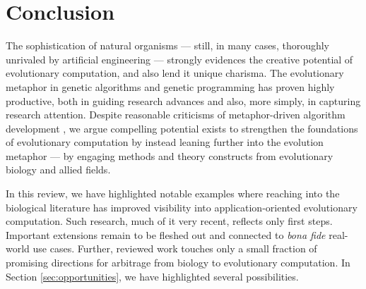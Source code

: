 
\section{Conclusion} \label{sec:conclusion}

The sophistication of natural organisms --- still, in many cases, thoroughly unrivaled by artificial engineering --- strongly evidences the creative potential of evolutionary computation, and also lend it unique charisma.
The evolutionary metaphor in genetic algorithms and genetic programming has proven highly productive, both in guiding research advances and also, more simply, in capturing research attention.
Despite reasonable criticisms of metaphor-driven algorithm development \citep{moore2023evolution,sorensen2015metaheuristics}, we argue compelling potential exists to strengthen the foundations of evolutionary computation by instead leaning further into the evolution metaphor --- by engaging methods and theory constructs from evolutionary biology and allied fields.

In this review, we have highlighted notable examples where reaching into the biological literature has improved visibility into application-oriented evolutionary computation.
Such research, much of it very recent, reflects only first steps.
Important extensions remain to be fleshed out and connected to \textit{bona fide} real-world use cases.
Further, reviewed work touches only a small fraction of promising directions for arbitrage from biology to evolutionary computation.
In Section \ref{sec:opportunities}, we have highlighted several possibilities.

